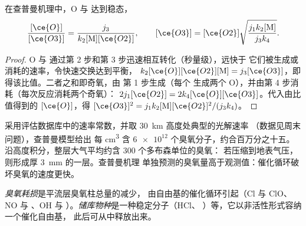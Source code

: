 \begin{theorem}[查普曼稳态]\label{thm:b3:photochemistry:chapman}
在查普曼机理中，O 与  达到稳态，
\[
  \frac{[\ce{O}]}{[\ce{O3}]} = \frac{j_3}{k_2[\mathrm M][\ce{O2}]}, \qquad
  [\ce{O3}] = [\ce{O2}]\sqrt{\frac{j_1k_2[\mathrm M]}{j_3k_4}} .
\]
\end{theorem}

\begin{proof}
O 与  通过第 2 步和第 3 步迅速相互转化（秒量级），远快于
它们被生成或消耗的速率，令快速交换达到平衡，
$k_2[\ce{O}][\ce{O2}][\mathrm M] = j_3[\ce{O3}]$，即得该比值。二者之和即奇氧，由
第 1 步生成（每个  生成两个 O），并由第 4 步消耗（每次反应消耗两个奇氧）：
$2j_1[\ce{O2}] = 2k_4[\ce{O}][\ce{O3}]$。代入由比值得到的 $[\ce{O}]$，得 $[\ce{O3}]^2 = j_1k_2[\mathrm M][\ce{O2}]^2/(j_3k_4)$。
\end{proof}

采用评估数据库中的速率常数，并取 \qty{30}{km} 高度处典型的光解速率
（数据见周末问题），查普曼模型给出
每 \unit{cm^3} 含 $\num{6e12}$ 个臭氧分子，约合百万分之十五。
沿高度积分，整层大气平均约含 300 个多布森单位的臭氧：
若压缩到地表气压，则形成厚 \qty{3}{mm} 的一层。查普曼机理
单独预测的臭氧量高于观测值：催化循环破坏臭氧的速度更快。

\begin{definition}\label{def:b3:photochemistry:ozone-depletion}
\emph{臭氧耗损}是平流层臭氧柱总量的减少，
由自由基的催化循环引起（Cl 与 ClO、
NO 与 、OH 与 ）。\emph{储库物种}是一种稳定分子（HCl、
）等，它以非活性形式容纳一个催化自由基，
此后可从中释放出来。
\end{definition}

